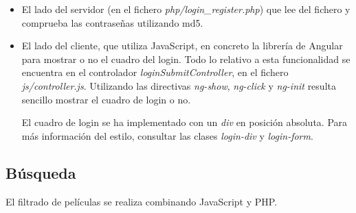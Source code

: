 \documentclass{apuntes}
\begin{document}
\begin{itemize}

\item El lado del servidor (en el fichero \textit{php/login\_register.php}) que lee del fichero y comprueba las contraseñas utilizando md5.

\item El lado del cliente, que utiliza JavaScript, en concreto la librería de Angular para mostrar o no el cuadro del login. Todo lo relativo a esta funcionalidad se encuentra en el controlador \textit{loginSubmitController}, en el fichero \textit{js/controller.js}. Utilizando las directivas \textit{ng-show}, \textit{ng-click} y \textit{ng-init} resulta sencillo mostrar el cuadro de login o no. 

El cuadro de login se ha implementado con un \textit{div} en posición absoluta. Para más información del estilo, consultar las clases \textit{login-div} y \textit{login-form}.

\end{itemize}


\subsection{Búsqueda}
El filtrado de películas se realiza combinando JavaScript y PHP. 
\end{document}
